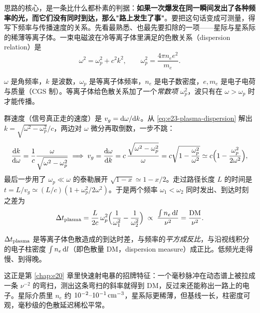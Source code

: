 思路的核心，是一条比什么都朴素的判据：\textbf{如果一次爆发在同一瞬间发出了各种频率的光，而它们没有同时到达，那么"路上发生了事"}。要把这句话变成可测量，得写下频率与传播速度的关系。先看最熟悉、也最先要扣除的一项——星际与星系际的稀薄等离子体。一束电磁波在冷等离子体里满足的色散关系（dispersion relation）是
\begin{equation}
  \omega^2=\omega_p^2+c^2k^2,
  \qquad
  \omega_p^2=\frac{4\pi n_e e^2}{m_e}.
  \label{eq:e23-plasma-dispersion}
\end{equation}
\begin{formulaexplain}
\(\omega\) 是角频率，\(k\) 是波数，\(\omega_p\) 是等离子体频率，\(n_e\) 是电子数密度，\(e,m_e\) 是电子电荷与质量（CGS 制）。等离子体给色散关系加了一个\emph{常数项} \(\omega_p^2\)，波只有在 \(\omega>\omega_p\) 时才能传播。
\end{formulaexplain}
群速度（信号真正走的速度）是 \(v_g={\rm d}\omega/{\rm d}k\)。从 \eqref{eq:e23-plasma-dispersion} 解出 \(k=\sqrt{\omega^2-\omega_p^2}/c\)，两边对 \(\omega\) 微分再取倒数，一步不跳：
\[
  \frac{{\rm d}k}{{\rm d}\omega}=\frac{1}{c}\frac{\omega}{\sqrt{\omega^2-\omega_p^2}}
  \;\Longrightarrow\;
  v_g=\frac{{\rm d}\omega}{{\rm d}k}=c\,\frac{\sqrt{\omega^2-\omega_p^2}}{\omega}
  =c\sqrt{1-\frac{\omega_p^2}{\omega^2}}
  \simeq c\Bigl(1-\frac{\omega_p^2}{2\omega^2}\Bigr),
\]
最后一步用了 \(\omega_p\ll\omega\) 的泰勒展开 \(\sqrt{1-x}\simeq1-x/2\)。走过路径长度 \(L\) 的时间是 \(t=L/v_g\simeq(L/c)(1+\omega_p^2/2\omega^2)\)。于是两个频率 \(\omega_1<\omega_2\) 同时发出、到达时刻之差为
\begin{equation}
  \Delta t_{\rm plasma}
  =\frac{L}{2c}\,\omega_p^2\Bigl(\frac{1}{\omega_1^2}-\frac{1}{\omega_2^2}\Bigr)
  \;\propto\;\frac{\int n_e\,{\rm d}l}{\nu^2}
  =\frac{\rm DM}{\nu^2}.
  \label{eq:e23-dm-delay}
\end{equation}
\begin{formulaexplain}
\(\Delta t_{\rm plasma}\) 是等离子体色散造成的到达时差，与频率的\emph{平方成反比}，与沿视线积分的电子柱密度 \(\int n_e\,{\rm d}l\)（即色散量 DM，dispersion measure）成正比。低频光走得慢、到得晚。
\end{formulaexplain}
这正是第 \ref{chap:e20} 章里快速射电暴的招牌特征：一个毫秒脉冲在动态谱上被拉成一条 \(\nu^{-2}\) 的弯扫，测出这条弯扫的斜率就得到 DM，反过来还能称出一路上的电子。星际介质里 \(n_e\) 约 \(10^{-2}\text{--}10^{-1}\,{\rm cm^{-3}}\)，星系际更稀薄，但基线一长，柱密度可观，毫秒级的色散延迟稀松平常。

